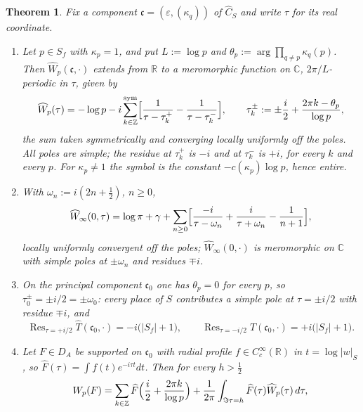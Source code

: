 \documentclass[11pt]{amsart}
\newtheorem{theorem}{Theorem}[section]
\theoremstyle{definition}
\theoremstyle{remark}
\newcommand{\C}{\mathbb C}
\newcommand{\R}{\mathbb R}
\newcommand{\Z}{\mathbb Z}
\newcommand{\Res}{\operatorname{Res}}
\newcommand{\Th}{\widehat{T}}
\newcommand{\Wh}{\widehat{W}}
\newcommand{\Ch}{\widehat{C}_S}
\newcommand{\DA}{D_A}
\begin{document}
\begin{theorem}\label{thm:ML}
Fix a component $\mathfrak c=(\varepsilon,(\kappa_q))$ of $\Ch$ and write
$\tau$ for its real coordinate.
\begin{enumerate}
\item[(a)] Let $p\in S_f$ with $\kappa_p=1$, and put $L:=\log p$ and
$\theta_p:=\arg\prod_{q\ne p}\kappa_q(p)$.  Then $\Wh_p(\mathfrak c,\cdot)$
extends from $\R$ to a meromorphic function on $\C$, $2\pi/L$-periodic in
$\tau$, given by
\begin{equation}\label{eq:MLp}
\Wh_p(\tau)=-\log p-i\sum_{k\in\Z}^{\mathrm{sym}}
\Bigl[\frac{1}{\tau-\tau_k^{+}}-\frac{1}{\tau-\tau_k^{-}}\Bigr],
\qquad \tau_k^{\pm}:=\pm\frac{i}{2}+\frac{2\pi k-\theta_p}{\log p},
\end{equation}
the sum taken symmetrically and converging locally uniformly off the poles.
All poles are simple; the residue at $\tau_k^{+}$ is $-i$ and at $\tau_k^{-}$
is $+i$, for every $k$ and every $p$.  For $\kappa_p\ne1$ the symbol is the
constant $-c(\kappa_p)\log p$, hence entire.
\item[(b)] With $\omega_n:=i(2n+\tfrac12)$, $n\ge0$,
\begin{equation}\label{eq:MLinf}
\Wh_{\infty}(0,\tau)=\log\pi+\gamma+\sum_{n\ge0}
\Bigl[\frac{-i}{\tau-\omega_n}+\frac{i}{\tau+\omega_n}-\frac{1}{n+1}\Bigr],
\end{equation}
locally uniformly convergent off the poles; $\Wh_{\infty}(0,\cdot)$ is
meromorphic on $\C$ with simple poles at $\pm\omega_n$ and residues $\mp i$.
\item[(c)] On the principal component $\mathfrak c_0$ one has $\theta_p=0$ for
every $p$, so $\tau_0^{\pm}=\pm i/2=\pm\omega_0$: every place of $S$
contributes a simple pole at $\tau=\pm i/2$ with residue $\mp i$, and
\begin{equation}\label{eq:residues}
\Res_{\tau=+i/2}\Th(\mathfrak c_0,\cdot)=-i\bigl(|S_f|+1\bigr),\qquad
\Res_{\tau=-i/2}\Th(\mathfrak c_0,\cdot)=+i\bigl(|S_f|+1\bigr).
\end{equation}
\item[(d)] Let $F\in\DA$ be supported on $\mathfrak c_0$ with radial profile
$f\in C_c^{\infty}(\R)$ in $t=\log|w|_S$, so
$\widehat F(\tau)=\int f(t)e^{-i\tau t}dt$.  Then for every $h>\tfrac12$
\begin{equation}\label{eq:contourp}
W_p(F)=\sum_{k\in\Z}\widehat F\Bigl(\frac{i}{2}+\frac{2\pi k}{\log p}\Bigr)
+\frac{1}{2\pi}\int_{\Im\tau=h}\widehat F(\tau)\Wh_p(\tau)\,d\tau ,
\end{equation}

\end{enumerate}
\end{theorem}
\end{document}
